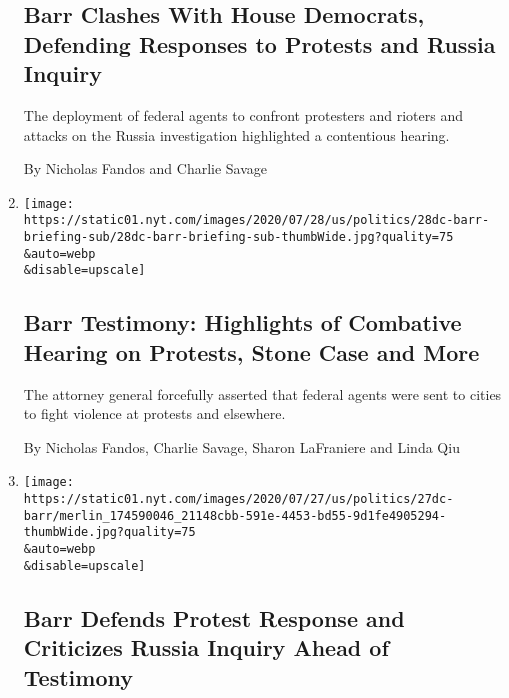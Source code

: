 \begin{enumerate}
  \hypertarget{barr-clashes-with-house-democrats-defending-responses-to-protests-and-russia-inquiry}{%
  \subsection{Barr Clashes With House Democrats, Defending Responses to
  Protests and Russia
  Inquiry}\label{barr-clashes-with-house-democrats-defending-responses-to-protests-and-russia-inquiry}}

  The deployment of federal agents to confront protesters and rioters
  and attacks on the Russia investigation highlighted a contentious
  hearing.

  By Nicholas Fandos and Charlie Savage
\item
  \href{/2020/07/28/us/politics/william-barr-house-judiciary-hearing.html}{}

  \texttt{[image: https://static01.nyt.com/images/2020/07/28/us/politics/28dc-barr-briefing-sub/28dc-barr-briefing-sub-thumbWide.jpg?quality=75\\\&auto=webp\\\&disable=upscale]}

  \hypertarget{barr-testimony-highlights-of-combative-hearing-on-protests-stone-case-and-more}{%
  \subsection{Barr Testimony: Highlights of Combative Hearing on
  Protests, Stone Case and
  More}\label{barr-testimony-highlights-of-combative-hearing-on-protests-stone-case-and-more}}

  The attorney general forcefully asserted that federal agents were sent
  to cities to fight violence at protests and elsewhere.

  By Nicholas Fandos, Charlie Savage, Sharon LaFraniere and Linda Qiu
\item
  \href{/2020/07/27/us/politics/william-barr-house-judiciary-hearing.html}{}

  \texttt{[image: https://static01.nyt.com/images/2020/07/27/us/politics/27dc-barr/merlin\_174590046\_21148cbb-591e-4453-bd55-9d1fe4905294-thumbWide.jpg?quality=75\\\&auto=webp\\\&disable=upscale]}

  \hypertarget{barr-defends-protest-response-and-criticizes-russia-inquiry-ahead-of-testimony}{%
  \subsection{Barr Defends Protest Response and Criticizes Russia
  Inquiry Ahead of
  Testimony}\label{barr-defends-protest-response-and-criticizes-russia-inquiry-ahead-of-testimony}}


\end{enumerate}
